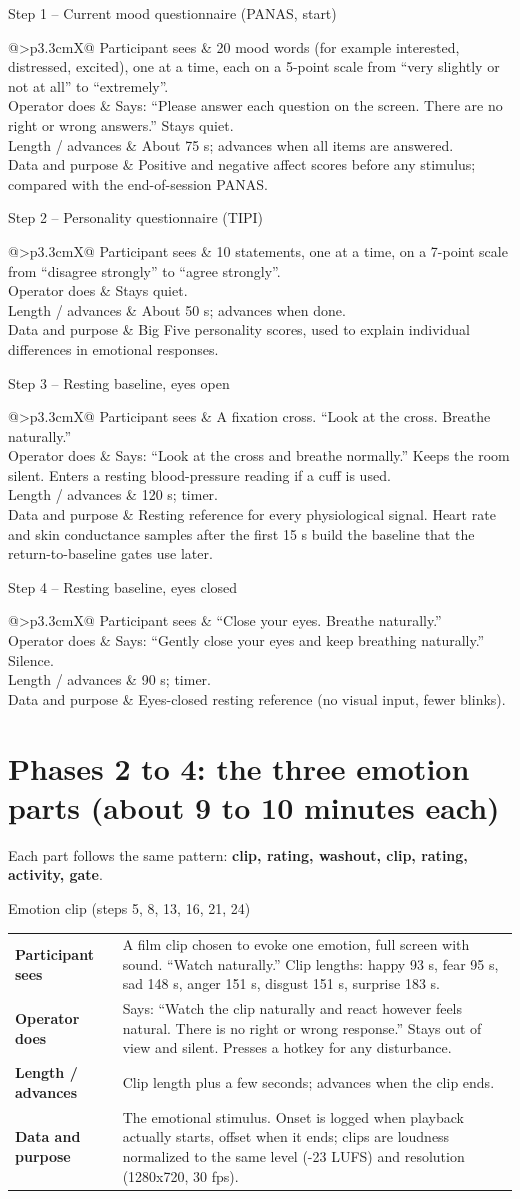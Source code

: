 \documentclass[11pt,a4paper]{article}
\makeatletter
\newcommand{\stepdetail}[4]{%
  \begin{tabularx}{\linewidth}{@{}>{\bfseries}p{3.3cm}X@{}}
    Participant sees & #1 \\
    Operator does & #2 \\
    Length / advances & #3 \\
    Data and purpose & #4 \\
  \end{tabularx}}
\makeatother
\begin{document}
\begin{stepbox}{Step 1 -- Current mood questionnaire (PANAS, start)}
\stepdetail{20 mood words (for example interested, distressed, excited), one at a time, each on a 5-point scale from
``very slightly or not at all'' to ``extremely''.}
{Says: ``Please answer each question on the screen. There are no right or wrong answers.'' Stays quiet.}
{About 75 s; advances when all items are answered.}
{Positive and negative affect scores before any stimulus; compared with the end-of-session PANAS.}
\end{stepbox}

\begin{stepbox}{Step 2 -- Personality questionnaire (TIPI)}
\stepdetail{10 statements, one at a time, on a 7-point scale from ``disagree strongly'' to ``agree strongly''.}
{Stays quiet.}
{About 50 s; advances when done.}
{Big Five personality scores, used to explain individual differences in emotional responses.}
\end{stepbox}

\begin{stepbox}{Step 3 -- Resting baseline, eyes open}
\stepdetail{A fixation cross. ``Look at the cross. Breathe naturally.''}
{Says: ``Look at the cross and breathe normally.'' Keeps the room silent. Enters a resting blood-pressure reading if
a cuff is used.}
{120 s; timer.}
{Resting reference for every physiological signal. Heart rate and skin conductance samples after the first 15 s
build the baseline that the return-to-baseline gates use later.}
\end{stepbox}

\begin{stepbox}{Step 4 -- Resting baseline, eyes closed}
\stepdetail{``Close your eyes. Breathe naturally.''}
{Says: ``Gently close your eyes and keep breathing naturally.'' Silence.}
{90 s; timer.}
{Eyes-closed resting reference (no visual input, fewer blinks).}
\end{stepbox}

\section{Phases 2 to 4: the three emotion parts (about 9 to 10 minutes each)}

Each part follows the same pattern: \textbf{clip, rating, washout, clip, rating, activity, gate}.

\begin{stepbox}{Emotion clip (steps 5, 8, 13, 16, 21, 24)}
\stepdetail{A film clip chosen to evoke one emotion, full screen with sound. ``Watch naturally.''
Clip lengths: happy 93 s, fear 95 s, sad 148 s, anger 151 s, disgust 151 s, surprise 183 s.}
{Says: ``Watch the clip naturally and react however feels natural. There is no right or wrong response.'' Stays
out of view and silent. Presses a hotkey for any disturbance.}
{Clip length plus a few seconds; advances when the clip ends.}
{The emotional stimulus. Onset is logged when playback actually starts, offset when it ends; clips are loudness
normalized to the same level (-23 LUFS) and resolution (1280x720, 30 fps).}
\end{stepbox}
\end{document}
